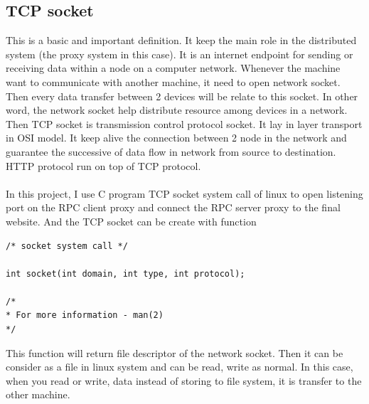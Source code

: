\documentclass{article}
\begin{document}
\subsection{TCP socket}
This is a basic and important definition. It keep the main role in the
distributed system (the proxy system in this case). It is an internet endpoint
for sending or receiving data within a node on a computer
network. Whenever the machine
want to communicate with another machine, it need to open network socket.
Then every data transfer between 2 devices will be relate to this socket.
In other word, the network socket help distribute resource among devices in
a network. Then TCP socket is transmission control protocol socket. It lay in
layer transport in OSI model. It keep alive the connection between 2 node in
the network and guarantee the successive of data flow in network from source
to destination. HTTP protocol run on top of TCP protocol.\\
\\
In this project, I use C program TCP socket system call of linux to open listening
port on the RPC client proxy and connect the RPC server proxy to the final website.
And the TCP socket can be create with function
\begin{verbatim}
/* socket system call */

int socket(int domain, int type, int protocol);

/*
* For more information - man(2)
*/
\end{verbatim}
This function will return file descriptor of the network socket.
Then it can be consider as a file in linux system and can be
read, write as normal. In this case, when you read or write, data
instead of storing to file system, it is transfer to the other machine.
\end{document}
